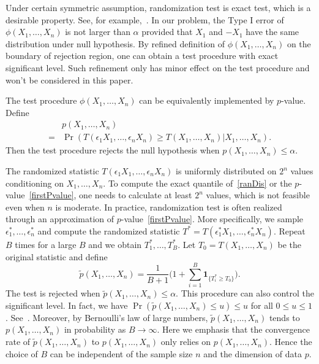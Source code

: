 \documentclass[review]{elsarticle}
\theoremstyle{plain}
\theoremstyle{definition}
\theoremstyle{remark}
\begin{document}
Under certain symmetric assumption, randomization test is exact test, which is a desirable property.
 See, for example,~\citet[Chapter 15]{Lehmann}.
In our problem, the Type I error of $\phi(X_1,\ldots,X_n)$ is not larger than $\alpha$ provided that $X_1$ and $-X_1$ have the same distribution under null hypothesis.
 By refined definition of $\phi(X_1,\ldots,X_n)$ on the boundary of rejection region, one can obtain a test procedure with exact significant  level. 
Such refinement only has minor effect on the test procedure and won't be considered in this paper.

The test procedure $\phi(X_1,\ldots, X_n)$ can be equivalently implemented by $p$-value. Define 
\begin{equation}\label{firstPvalue}
    \begin{aligned}
        &p(X_1,\ldots, X_n)\\
        =&\Pr(T(\epsilon_1 X_1,\ldots,\epsilon_n X_n)\geq T( X_1,\ldots,X_n)|X_1,\ldots,X_n).
    \end{aligned}
\end{equation}
Then the test procedure rejects the null hypothesis when $p(X_1,\ldots, X_n)\leq \alpha$. 

 The randomized statistic $T(\epsilon_1 X_1,\ldots,\epsilon_n X_n)$ is uniformly distributed on $2^n$ values conditioning on $X_1,\ldots, X_n$.
To compute the exact quantile of~\eqref{ranDis} or the $p$-value~\eqref{firstPvalue}, one needs to calculate at least $2^n$ values, which is not feasible even when $n$ is moderate.
In practice, randomization test is often realized through an approximation of $p$-value~\eqref{firstPvalue}.
More specifically, we sample  $\epsilon_1^*,\ldots,\epsilon_n^*$ and compute the randomized statistic $T^*=T(\epsilon_1^* X_1,\ldots,\epsilon_n^* X_n)$.
Repeat $B$ times for a large $B$ and we obtain $T_1^*,\ldots,T_B^*$.
Let $T_0=T(X_1,\ldots,X_n)$ be the original statistic and define
\begin{equation*}
\tilde{p}(X_1,\ldots,X_n)=\frac{1}{B+1}\big(1+\sum_{i=1}^B \mathbf{1}_{\{T_i^*\geq T_0\}}\big).
\end{equation*}
The test is rejected when $\tilde{p}(X_1,\ldots,X_n)\leq \alpha$. This procedure can also control the significant level.
In fact, we have
$\Pr(\tilde{p}(X_1,\ldots,X_n)\leq u)\leq u$ for all $0\leq u\leq 1$.
See~\citet[Page $636$]{Lehmann}.
Moreover, by Bernoulli's law of large numbers, $\tilde{p}(X_1,\ldots,X_n)$ tends to $p(X_1,\ldots,X_n)$ in probability  as $B\to \infty$.
{Here we emphasis that the convergence rate of $\tilde{p}(X_1,\ldots,X_n)$ to $p(X_1,\ldots,X_n)$ only relies on $p(X_1,\ldots,X_n)$.
Hence the choice of $B$ can be independent of the sample size $n$ and the dimension of data $p$.}
\end{document}
